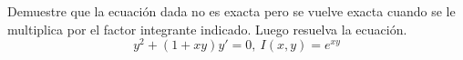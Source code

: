 \item Demuestre que la ecuación dada no es exacta pero se vuelve exacta cuando se le multiplica por el factor integrante indicado. Luego resuelva la ecuación.
    \[ y^2 + (1 + xy)y' = 0, \ I(x, y) = e^{xy} \]
